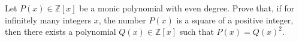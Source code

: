 Let $P(x)\in \mathbb{Z}[x]$ be a monic polynomial with even degree. Prove that, if for infinitely many integers $x$, the number $P(x)$ is a square of a positive integer, then there exists a polynomial $Q(x)\in\mathbb{Z}[x]$ such that $P(x)=Q(x)^2$.